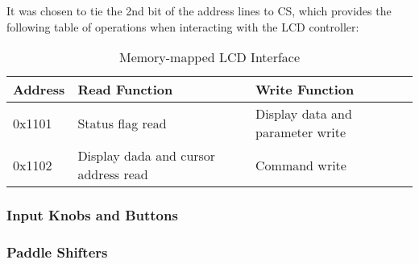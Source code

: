 It was chosen to tie the 2nd bit of the address lines to CS, which provides the following table of operations when interacting with the LCD controller:

\begin{table}
\caption{Memory-mapped LCD Interface}
\centering{}
\begin{tabular}{|l|l|l|}
\hline 
Address  & Read Function  & Write Function\tabularnewline
\hline
\hline 
0x1101  & Status flag read  & Display data and parameter write\tabularnewline
\hline 
0x1102  & Display dada and cursor address read  & Command write\tabularnewline
\hline
\end{tabular}
\end{table}

\subsubsection{Input Knobs and Buttons}


\subsubsection{Paddle Shifters}